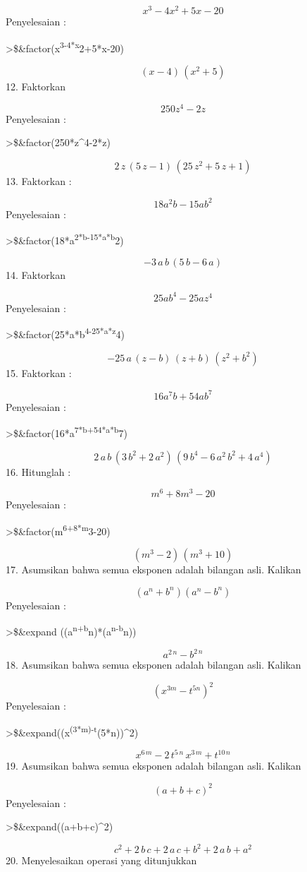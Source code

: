 \documentclass[
]{book}
\begin{document}
\[x^3-4x^2+5x-20\]Penyelesaian :

\textgreater\$\&factor(x\textsuperscript{3-4*x}2+5*x-20)

\[\left(x-4\right)\,\left(x^2+5\right)\]12. Faktorkan

\[250z^4-2z\]Penyelesaian :

\textgreater\$\&factor(250*z\^{}4-2*z)

\[2\,z\,\left(5\,z-1\right)\,\left(25\,z^2+5\,z+1\right)\]13. Faktorkan :

\[18a^2b-15ab^2\]Penyelesaian :

\textgreater\$\&factor(18*a\textsuperscript{2*b-15*a*b}2)

\[-3\,a\,b\,\left(5\,b-6\,a\right)\]14. Faktorkan

\[25ab^4-25az^4\]Penyelesaian :

\textgreater\$\&factor(25*a*b\textsuperscript{4-25*a*z}4)

\[-25\,a\,\left(z-b\right)\,\left(z+b\right)\,\left(z^2+b^2\right)\]15. Faktorkan :

\[16a^7b+54ab^7\]Penyelesaian :

\textgreater\$\&factor(16*a\textsuperscript{7*b+54*a*b}7)

\[2\,a\,b\,\left(3\,b^2+2\,a^2\right)\,\left(9\,b^4-6\,a^2\,b^2+4\,a^
 4\right)\]16. Hitunglah :

\[m^6+8m^3-20\]Penyelesaian :

\textgreater\$\&factor(m\textsuperscript{6+8*m}3-20)

\[\left(m^3-2\right)\,\left(m^3+10\right)\]17. Asumsikan bahwa semua eksponen adalah bilangan asli. Kalikan

\[(a^n+b^n)(a^n-b^n)\]Penyelesaian :

\textgreater\$\&expand ((a\textsuperscript{n+b}n)*(a\textsuperscript{n-b}n))

\[a^{2\,n}-b^{2\,n}\]18. Asumsikan bahwa semua eksponen adalah bilangan asli. Kalikan

\[(x^{3m}-t^{5n})^2\]Penyelesaian :

\textgreater\$\&expand((x\textsuperscript{(3*m)-t}(5*n))\^{}2)

\[x^{6\,m}-2\,t^{5\,n}\,x^{3\,m}+t^{10\,n}\]19. Asumsikan bahwa semua eksponen adalah bilangan asli. Kalikan

\[(a+b+c)^2\]Penyelesaian :

\textgreater\$\&expand((a+b+c)\^{}2)

\[c^2+2\,b\,c+2\,a\,c+b^2+2\,a\,b+a^2\]20. Menyelesaikan operasi yang ditunjukkan
\end{document}
